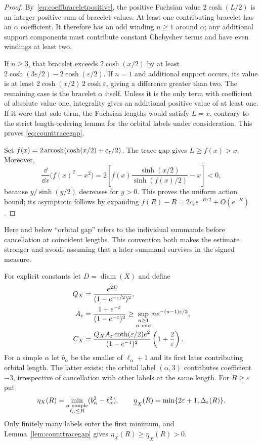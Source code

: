 \begin{proof}
By~\eqref{eq:coeffbraceletpositive}, the positive Fuchsian value
$2\cosh(L/2)$ is an integer positive sum of bracelet values.
At least one contributing bracelet has an $\alpha$ coefficient.
It therefore has an odd winding $n\geq1$ around $\alpha$;
any additional support components must contribute constant
Chebyshev terms and have even windings at least two.

If $n\geq3$, that bracelet exceeds $2\cosh(x/2)$ by at least
$2\cosh(3\varepsilon/2)-2\cosh(\varepsilon/2)$.
If $n=1$ and additional support occurs, its value is at least
$2\cosh(x/2)\,2\cosh\varepsilon$, giving a difference greater
than two. The remaining case is the bracelet $\alpha$ itself.
Unless it is the only term with coefficient of absolute value one,
integrality gives an additional positive value of at least one.
If it were that sole term, the Fuchsian lengths would satisfy
$L=x$, contrary to the strict length-ordering lemma for the
orbital labels under consideration. This proves
\eqref{eq:counttracegap}.

Set $f(x)=2\operatorname{arcosh}(\cosh(x/2)+c_\varepsilon/2)$.
The trace gap gives $L\geq f(x)>x$. Moreover,
\[
 \frac{\dd}{\dd x}\bigl(f(x)^2-x^2\bigr)
 =2\left[f(x)\frac{\sinh(x/2)}{\sinh(f(x)/2)}-x\right]<0,
\]
because $y/\sinh(y/2)$ decreases for $y>0$.
This proves the uniform action bound; its asymptotic follows by
expanding $f(R)-R=2c_\varepsilon e^{-R/2}+O(e^{-R})$.
\end{proof}

Here and below ``orbital gap'' refers to the individual summands
before cancellation at coincident lengths. This convention both
makes the estimate stronger and avoids assuming that a later
summand survives in the signed measure.

For explicit constants let $D=\operatorname{diam}(X)$ and define
\begin{align}
 Q_X&=\frac{e^{2D}}{(1-e^{-\varepsilon/2})^2},\notag\\
 A_\varepsilon&=\frac{1+e^{-\varepsilon}}{(1-e^{-\varepsilon})^2}
       \geq\sup_{\substack{n\geq1\\n\ {\rm odd}}}
             n e^{-(n-1)\varepsilon/2},\notag\\
 C_X&=\frac{Q_X A_\varepsilon\coth(\varepsilon/2)e^2}
               {(1-e^{-1})^2}\left(1+\frac2\varepsilon\right).
 \label{eq:countuniformconstants}
\end{align}
For a simple $\alpha$ let $b_\alpha$ be the smaller of
$\ell_\alpha+1$ and its first later contributing orbital length.
The latter exists: the orbital label $(\alpha,3)$ contributes
coefficient $-3$, irrespective of cancellation with other labels
at the same length.
For $R\geq\varepsilon$ put
\[
 \eta_X(R)=\min_{\substack{\alpha\ {\rm simple}\\\ell_\alpha\leq R}}
             (b_\alpha^2-\ell_\alpha^2),\qquad
 \underline\eta_X(R)=
             \min\{2\varepsilon+1,\Delta_\varepsilon(R)\}.
\]
Only finitely many labels enter the first minimum, and
Lemma~\ref{lem:counttracegap} gives
$\eta_X(R)\geq\underline\eta_X(R)>0$.

